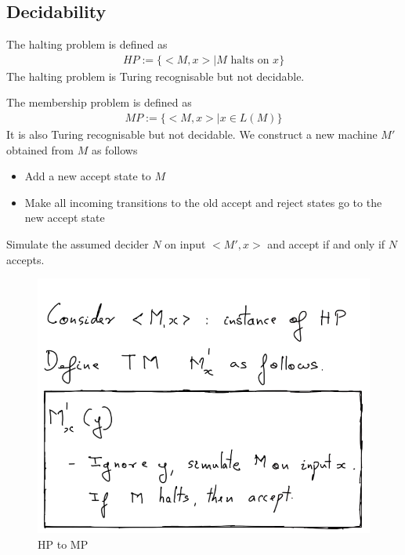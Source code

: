 \documentclass[a4paper]{article}
\theoremstyle{plain}
\theoremstyle{definition}
\newtheorem{defn}{Definition}[section]
\theoremstyle{remark}
\begin{document}
\subsection{Decidability}
\begin{tcolorbox}[colback=black!3!white,colframe=black!60!white,title=\begin{defn}Halting Problem \label{Halting Problem}\end{defn}]
The halting problem is defined as
\begin{align}
HP := \{ <M,x> |M \text{ halts on }x \}
\end{align}
The halting problem is Turing recognisable but not decidable. 
\end{tcolorbox}
\begin{tcolorbox}[colback=black!3!white,colframe=black!60!white,title=\begin{defn}Membership Problem \label{Membership Proble}\end{defn}]
The membership problem is defined as
\begin{align}
MP := \{ <M,x> | x \in L(M)\}
\end{align}
It is also Turing recognisable but not decidable. We construct a new machine $M'$ obtained from $M$ as follows
\begin{itemize}
	\item Add a new accept state to $M$ 
	\item Make all incoming transitions to the old accept and reject states go to the new accept state
\end{itemize}
Simulate the assumed decider $N$ on input $<M',x>$ and accept if and only if $N$ accepts.
\begin{figure}[H]
	\centering
	\includegraphics[width=0.6 \textwidth]{nineteen.png}
	\caption{HP to MP}
	\label{fig:nineteen-png}
\end{figure}
\end{tcolorbox}
\end{document}
